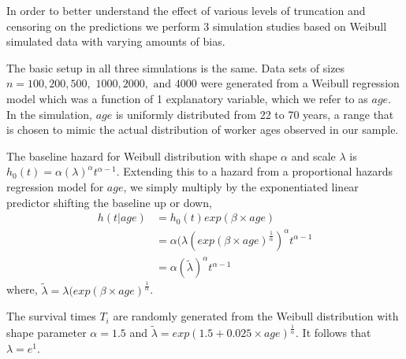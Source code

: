 \documentclass[12pt,letterpaper]{article}
\begin{document}
In order to better understand the effect of various levels of truncation and censoring on the predictions we perform 3 simulation studies based on Weibull simulated data with varying amounts of bias.

The basic setup in all three simulations is the same. Data sets of sizes $n =100, 200, 500,$ $1000, 2000,$ $\text{and } 4000$ were generated from a Weibull regression model which was a function of 1 explanatory variable, which we refer to as $age$.  In the simulation, $age$ is uniformly distributed from 22 to 70 years, a range that is chosen to mimic the actual distribution of worker ages observed in our sample.

The baseline hazard for Weibull distribution with shape $\alpha$ and scale $\lambda$ is $h_0(t)=\alpha(\lambda)^\alpha t^{\alpha-1}$.  Extending this to a hazard from a proportional hazards regression model for $age$, we simply multiply by the exponentiated linear predictor shifting the baseline up or down,
\begin{equation} \label{eq:weibull}
\begin{split}%
h(t|age) & =h_0(t)exp(\beta \times age) \\
&=\alpha (\lambda (exp(\beta \times age)^{\frac{1}{\alpha}})^\alpha t^{\alpha-1} \\
&=\alpha(\tilde{\lambda} )^\alpha t^{\alpha-1}
\end{split}
\end{equation}
where, $\tilde{\lambda}=\lambda (exp(\beta \times age)^{\frac{1}{\alpha}}$.

The survival times $T_i$ are randomly generated from the Weibull distribution with shape parameter $\alpha=1.5$ and $\tilde{\lambda}=exp(1.5 +0.025 \times age)^{\frac{1}{\alpha}}$.  It follows that $\lambda = e^1$.
\end{document}
